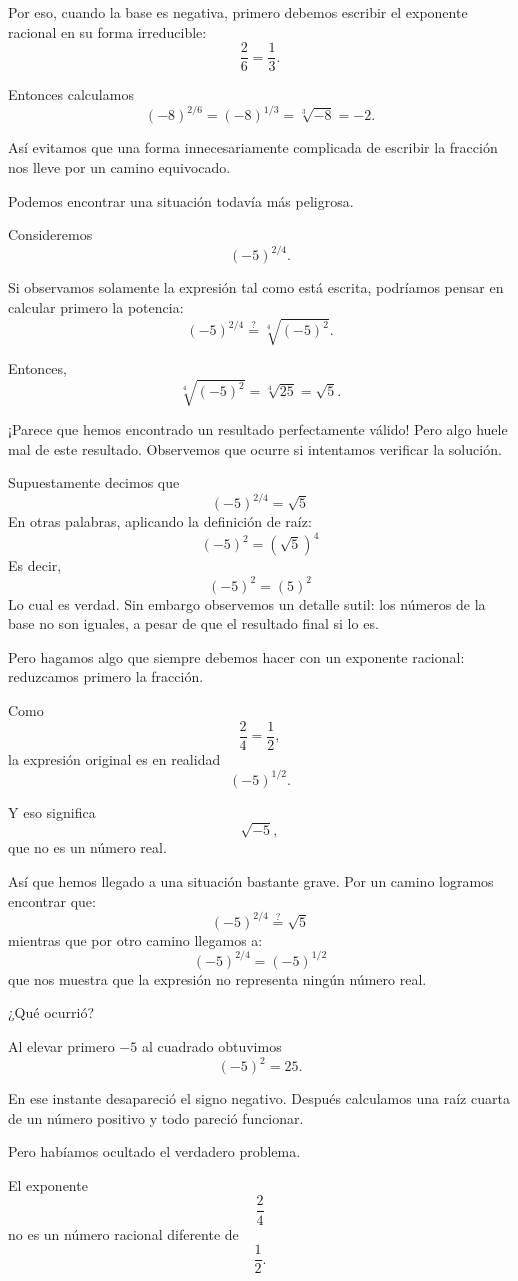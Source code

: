 Por eso, cuando la base es negativa, primero debemos escribir el exponente racional en su forma irreducible:
\[
\frac26=\frac13.
\]

Entonces calculamos
\[
(-8)^{2/6}
=
(-8)^{1/3}
=
\sqrt[3]{-8}
=
-2.
\]

Así evitamos que una forma innecesariamente complicada de escribir la fracción nos lleve por un camino equivocado.

Podemos encontrar una situación todavía más peligrosa.

Consideremos
\[
(-5)^{2/4}.
\]

Si observamos solamente la expresión tal como está escrita, podríamos pensar en calcular primero la potencia:
\[
(-5)^{2/4}
\stackrel{?}{=}
\sqrt[4]{(-5)^2}.
\]

Entonces,
\[
\sqrt[4]{(-5)^2}
=
\sqrt[4]{25}
=
\sqrt{5}.
\]

¡Parece que hemos encontrado un resultado perfectamente válido! Pero algo huele mal de este resultado. Observemos que ocurre si intentamos verificar la solución. 

Supuestamente decimos que 
\[
  (-5)^{2/4} = \sqrt5
\]
En otras palabras, aplicando la definición de raíz:
\[
  (-5)^2 = \left(\sqrt{5}\right)^4
\]
Es decir, 
\[
  (-5)^2 = (5)^2
\]
Lo cual es verdad. Sin embargo observemos un detalle sutil: los números de la base no son iguales, a pesar de que el resultado final si lo es.

Pero hagamos algo que siempre debemos hacer con un exponente racional: reduzcamos primero la fracción.

Como
\[
\frac24=\frac12,
\]
la expresión original es en realidad
\[
(-5)^{1/2}.
\]

Y eso significa
\[
\sqrt{-5},
\]
que no es un número real.

Así que hemos llegado a una situación bastante grave. Por un camino logramos encontrar que:
\[
(-5)^{2/4}
\stackrel{?}{=}
\sqrt5
\]
mientras que por otro camino llegamos a:
\[
(-5)^{2/4}
=
(-5)^{1/2}
\]
que nos muestra que la expresión no representa ningún número real.

¿Qué ocurrió?

Al elevar primero \(-5\) al cuadrado obtuvimos
\[
(-5)^2=25.
\]

En ese instante desapareció el signo negativo. Después calculamos una raíz cuarta de un número positivo y todo pareció funcionar.

Pero habíamos ocultado el verdadero problema.

El exponente
\[
\frac24
\]
no es un número racional diferente de
\[
\frac12.
\]

